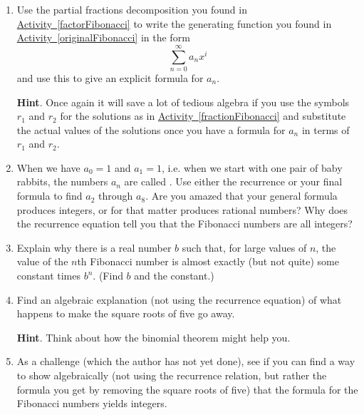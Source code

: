 \documentclass{book}
\begin{document}
\setcounter{cpjt}{269}
\addtocounter{cpjt}{-1}
\begin{activity}\label{solveFibonacci}
\leavevmode%
\begin{enumerate}[font=\bfseries,label=(\alph*),ref=\alph*]
\item\label{task-247} \hypertarget{p-1370}{}%
Use the partial fractions decomposition you found in \hyperref[factorFibonacci]{Activity~\ref{factorFibonacci}} to write the generating function you found in \hyperref[originalFibonacci]{Activity~\ref{originalFibonacci}} in the form%
\begin{equation*}
\sum_{n=0}^\infty a_nx^i
\end{equation*}
and use this to give an explicit formula for \(a_n\).%
\par\smallskip%
\noindent\textbf{Hint}.\hypertarget{hint-172}{}\quad%
\hypertarget{p-1371}{}%
Once again it will save a lot of tedious algebra if you use the symbols \(r_1\) and \(r_2\) for the solutions as in \hyperref[fractionFibonacci]{Activity~\ref{fractionFibonacci}} and substitute the actual values of the solutions once you have a formula for \(a_n\) in terms of \(r_1\) and \(r_2\).%
\par\smallskip%
\noindent\item\label{task-248} \hypertarget{p-1373}{}%
When we have \(a_0=1\) and \(a_1=1\), i.e. when we start with one pair of baby rabbits, the numbers \(a_n\) are called .  Use either the recurrence or your final formula to find \(a_2\) through \(a_8\).  Are you amazed that your general formula produces integers, or for that matter produces rational numbers?  Why does the recurrence equation tell you that the Fibonacci numbers are all integers?%
\par\smallskip%
\noindent\item\label{task-249} \hypertarget{p-1375}{}%
Explain why there is a real number \(b\) such that, for large values of \(n\), the value of the \(n\)th Fibonacci number is almost exactly (but not quite) some constant times \(b^n\). (Find \(b\) and the constant.)%
\par\smallskip%
\noindent\item\label{task-250} \hypertarget{p-1377}{}%
Find an algebraic explanation (not using the recurrence equation) of what happens to make the square roots of five go away.%
\par\smallskip%
\noindent\textbf{Hint}.\hypertarget{hint-173}{}\quad%
\hypertarget{p-1378}{}%
Think about how the binomial theorem might help you.%
\par\smallskip%
\noindent\item\label{task-251} \hypertarget{p-1380}{}%
As a challenge (which the author has not yet done), see if you can find a way to show algebraically (not using the recurrence relation, but rather the formula you get by removing the square roots of five) that the formula for the Fibonacci numbers yields integers.%
\par\smallskip%
\noindent\end{enumerate}
\end{activity}

\clearpage
\end{document}

